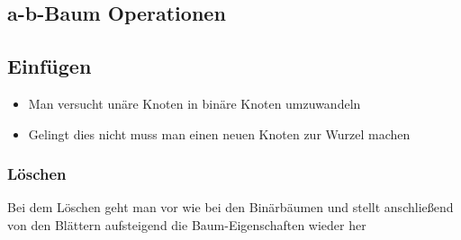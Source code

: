 \subsection{a-b-Baum Operationen}
\subsection{Einfügen}
	\begin{itemize}
	  \item Man versucht unäre Knoten in binäre Knoten umzuwandeln 
	  \item Gelingt dies nicht muss man einen neuen Knoten zur Wurzel machen
	\end{itemize}
\subsubsection{Löschen}
	Bei dem Löschen geht man vor wie bei den Binärbäumen und stellt anschließend von den Blättern aufsteigend die Baum-Eigenschaften wieder her

	
		
	
	
	